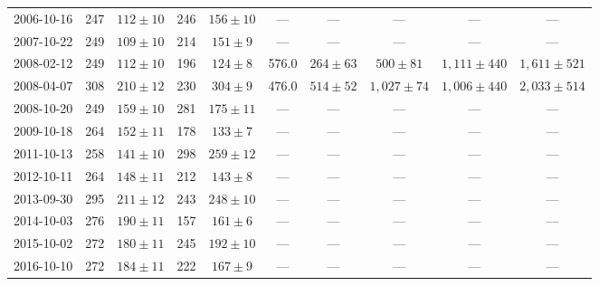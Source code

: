 \begin{landscape}
\begin{longtable}{cccccccccc}
{2006-10-16} & 247 & {$112  \pm  10$} & 246 & {$156 \pm 10$} & --- & --- & --- & --- & --- \\
{2007-10-22} & 249 & {$109  \pm  10$} & 214 & {$151 \pm 9$} & --- & --- & --- & --- & --- \\
{2008-02-12} & 249 & {$112  \pm  10$} & 196 & {$124 \pm 8$} & 576.0 & {$264 \pm 63$} & {$500 \pm 81$} & {$1,111 \pm 440$} & {$1,611 \pm 521$} \\
{2008-04-07} & 308 & {$210  \pm  12$} & 230 & {$304 \pm 9$} & 476.0 & {$514 \pm 52$} & {$1,027 \pm 74$} & {$1,006 \pm 440$} & {$2,033 \pm 514$} \\
{2008-10-20} & 249 & {$159  \pm  10$} & 281 & {$175 \pm 11$} & --- & --- & --- & --- & --- \\
{2009-10-18} & 264 & {$152  \pm  11$} & 178 & {$133 \pm 7$} & --- & --- & --- & --- & --- \\
{2011-10-13} & 258 & {$141  \pm  10$} & 298 & {$259 \pm 12$} & --- & --- & --- & --- & --- \\
{2012-10-11} & 264 & {$148  \pm  11$} & 212 & {$143 \pm 8$} & --- & --- & --- & --- & --- \\
{2013-09-30} & 295 & {$211  \pm  12$} & 243 & {$248 \pm 10$} & --- & --- & --- & --- & --- \\
{2014-10-03} & 276 & {$190  \pm  11$} & 157 & {$161 \pm 6$} & --- & --- & --- & --- & --- \\
{2015-10-02} & 272 & {$180  \pm  11$} & 245 & {$192 \pm 10$} & --- & --- & --- & --- & --- \\
{2016-10-10} & 272 & {$184  \pm  11$} & 222 & {$167 \pm 9$} & --- & --- & --- & --- & --- \\
\end{longtable} 
\end{landscape} 
